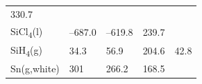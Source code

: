 \documentclass[
  9pt,
]{extbook}
\theoremstyle{definition}
\theoremstyle{definition}
\theoremstyle{definition}
\theoremstyle{remark}
\begin{document}
\begin{longtable}[]{@{}lllll@{}}
\begin{minipage}[t]{0.18\columnwidth}
330.7\strut
\end{minipage} & \begin{minipage}[t]{0.18\columnwidth}\raggedright
\strut
\end{minipage}\tabularnewline
\begin{minipage}[t]{0.10\columnwidth}\raggedright
SiCl\textsubscript{4}(l)\strut
\end{minipage} & \begin{minipage}[t]{0.19\columnwidth}\raggedright
--687.0\strut
\end{minipage} & \begin{minipage}[t]{0.20\columnwidth}\raggedright
--619.8\strut
\end{minipage} & \begin{minipage}[t]{0.18\columnwidth}\raggedright
239.7\strut
\end{minipage} & \begin{minipage}[t]{0.18\columnwidth}\raggedright
\strut
\end{minipage}\tabularnewline
\begin{minipage}[t]{0.10\columnwidth}\raggedright
SiH\textsubscript{4}(g)\strut
\end{minipage} & \begin{minipage}[t]{0.19\columnwidth}\raggedright
34.3\strut
\end{minipage} & \begin{minipage}[t]{0.20\columnwidth}\raggedright
56.9\strut
\end{minipage} & \begin{minipage}[t]{0.18\columnwidth}\raggedright
204.6\strut
\end{minipage} & \begin{minipage}[t]{0.18\columnwidth}\raggedright
42.8\strut
\end{minipage}\tabularnewline
\begin{minipage}[t]{0.10\columnwidth}\raggedright
Sn(g,white)\strut
\end{minipage} & \begin{minipage}[t]{0.19\columnwidth}\raggedright
301\strut
\end{minipage} & \begin{minipage}[t]{0.20\columnwidth}\raggedright
266.2\strut
\end{minipage} & \begin{minipage}[t]{0.18\columnwidth}\raggedright
168.5\strut
\end{minipage} & \begin{minipage}[t]{0.18\columnwidth}\raggedright

\end{minipage}
\end{longtable}
\end{document}
